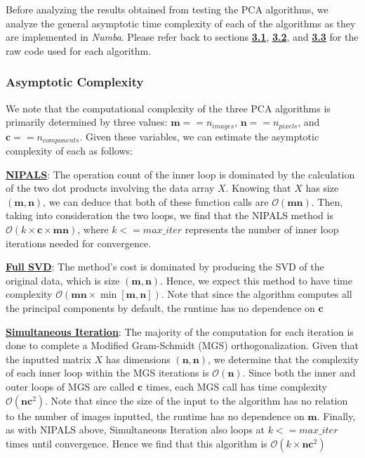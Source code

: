 \documentclass[12pt]{article}
\begin{document}
Before analyzing the results obtained from testing the PCA algorithms, we analyze the general asymptotic time complexity of each of the algorithms as they are implemented in \textit{Numba}. Please refer back to sections \textbf{\hyperref[3.1]{3.1}}, \textbf{\hyperref[3.2]{3.2}}, and \textbf{\hyperref[3.3]{3.3}} for the raw code used for each algorithm.

\subsubsection{Asymptotic Complexity}\label{5.1.1}

We note that the computational complexity of the three PCA algorithms is primarily determined by three values: $\textbf{m} == n_{images}$, $\textbf{n} == n_{pixels}$, and $\textbf{c} == n_{components}$.  Given these variables, we can estimate the asymptotic complexity of each as follows:

\textbf{\hyperref[3.1]{NIPALS}}: The operation count of the inner loop is dominated by the calculation of the two dot products involving the data array $X$. Knowing that $X$ has size $(\textbf{m}, \textbf{n})$, we can deduce that both of these function calls are $\mathcal{O}(\textbf{m}\textbf{n})$. Then, taking into consideration the two loops, we find that the NIPALS method is $\mathcal{O}(k \times \textbf{c} \times \textbf{m}\textbf{n})$, where $k<=max\_iter$ represents the number of inner loop iterations needed for convergence.

\textbf{\hyperref[3.2]{Full SVD}}: The method's cost is dominated by producing the SVD of the original data, which is size $(\textbf{m}, \textbf{n})$. Hence, we expect this method to have time complexity $\mathcal{O}(\textbf{m}\textbf{n} \times \min[\textbf{m}, \textbf{n}])$. Note that since the algorithm computes all the principal components by default, the runtime has no dependence on $\textbf{c}$

\textbf{\hyperref[3.3]{Simultaneous Iteration}}: The majority of the computation for each iteration is done to complete a Modified Gram-Schmidt (MGS) orthogonalization. Given that the inputted matrix $X$ has dimensions $(\textbf{n}, \textbf{n})$, we determine that the complexity of each inner loop within the MGS iterations is $\mathcal{O}(\textbf{n})$. Since both the inner and outer loops of MGS are called $\textbf{c}$ times, each MGS call has time complexity $\mathcal{O}(\textbf{n}\textbf{c}^2)$. Note that since the size of the input to the algorithm has no relation to the number of images inputted, the runtime has no dependence on $\textbf{m}$. Finally, as with NIPALS above, Simultaneous Iteration also loops at $k <=max\_iter$ times until convergence. Hence we find that this algorithm is $\mathcal{O}(k \times \textbf{n}\textbf{c}^2)$
\end{document}
